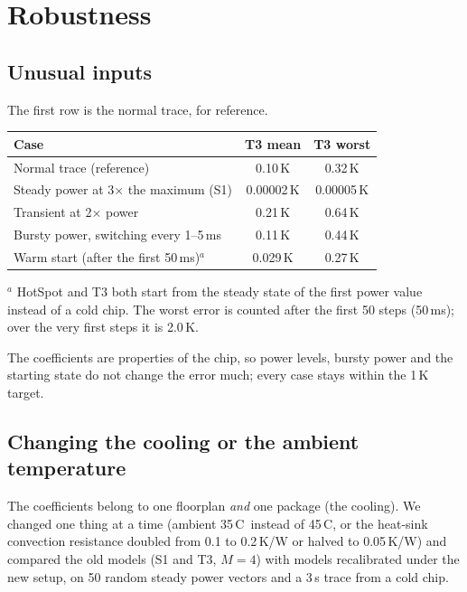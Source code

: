 \documentclass[11pt,a4paper]{article}
\newcommand{\degC}{\,\textdegree C}
\begin{document}
\section{Robustness}

\subsection{Unusual inputs}
The first row is the normal trace, for reference.
\begin{center}
\small
\begin{tabular}{@{}l c c@{}}
\toprule
Case & T3 mean & T3 worst \\
\midrule
Normal trace (reference) & 0.10\,K & 0.32\,K \\
Steady power at 3$\times$ the maximum (S1) & 0.00002\,K & 0.00005\,K \\
Transient at 2$\times$ power & 0.21\,K & 0.64\,K \\
Bursty power, switching every 1--5\,ms & 0.11\,K & 0.44\,K \\
Warm start (after the first 50\,ms)$^{a}$ & 0.029\,K & 0.27\,K \\
\bottomrule
\end{tabular}

\smallskip
\begin{minipage}{0.9\linewidth}\footnotesize
$^{a}$ HotSpot and T3 both start from the steady state of the first power value instead of a cold
chip. The worst error is counted after the first 50 steps (50\,ms); over the very first steps it is
2.0\,K.
\end{minipage}
\end{center}
The coefficients are properties of the chip, so power levels, bursty power and the starting state
do not change the error much; every case stays within the 1\,K target.

\subsection{Changing the cooling or the ambient temperature}
The coefficients belong to one floorplan \emph{and} one package (the cooling). We changed one thing at a time (ambient 35\degC\ instead of 45\degC, or the heat-sink
convection resistance doubled from 0.1 to 0.2\,K/W or halved to 0.05\,K/W) and compared the old
models (S1 and T3, $M=4$) with models recalibrated under the new setup, on 50 random steady power
vectors and a 3\,s trace from a cold chip.
\end{document}
